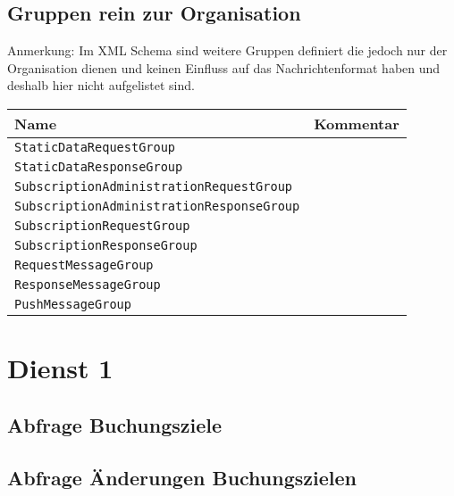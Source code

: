 \subsection*{Gruppen rein zur Organisation}
Anmerkung: Im XML Schema sind weitere Gruppen definiert die jedoch nur der Organisation dienen und keinen Einfluss auf das Nachrichtenformat haben und deshalb hier nicht aufgelistet sind.
\begin{samepage}
\begin{flushleft}
\begin{tabularx}{\linewidth}{l>{\raggedright\arraybackslash}X} 
\toprule
Name &  Kommentar \label{tab:miscGroups}\\
\midrule 
\texttt{StaticDataRequestGroup} & \\
\texttt{StaticDataResponseGroup}& \\
\texttt{SubscriptionAdministrationRequestGroup} & \\
\texttt{SubscriptionAdministrationResponseGroup}& \\
\texttt{SubscriptionRequestGroup} & \\
\texttt{SubscriptionResponseGroup}& \\
\texttt{RequestMessageGroup}& \\
\texttt{ResponseMessageGroup}& \\
\texttt{PushMessageGroup}& \\
\bottomrule 
\end{tabularx}\end{flushleft}\end{samepage}

\section{Dienst 1}
\label{sec:Nachrichten:Dienst1}

\subsection*{Abfrage Buchungsziele}
\label{subsec:Nachrichten:Dienst1:BookingTargets}





\subsection*{Abfrage Änderungen Buchungszielen}
\label{subsec:Nachrichten:Dienst1:ChangeProviders}





